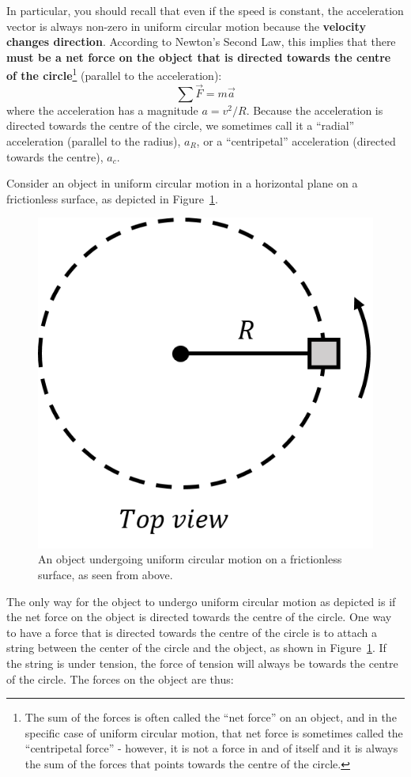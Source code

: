 In particular, you should recall that even if the speed is constant, the acceleration vector is always non-zero in uniform circular motion because the \textbf{velocity changes direction}. According to Newton's Second Law, this implies that there \textbf{must be a net force on the object that is directed towards the centre of the circle}\footnote{The sum of the forces is often called the ``net force'' on an object, and in the specific case of uniform circular motion, that net force is sometimes called the ``centripetal force'' - however, it is not a force in and of itself and it is always the sum of the forces that points towards the centre of the circle.} (parallel to the acceleration):
\begin{equation}
\sum \vec F = m\vec a
\end{equation}
where the acceleration has a magnitude $a=v^2/R$. Because the acceleration is directed towards the centre of the circle, we sometimes call it a ``radial'' acceleration (parallel to the radius), $a_R$, or a ``centripetal'' acceleration (directed towards the centre), $a_c$.

Consider an object in uniform circular motion in a horizontal plane on a frictionless surface, as depicted in Figure~\ref{fig:applyingnewtonslaws:circleH}.

\begin{figure}[!htbp]
\centering
\includegraphics[width=0.3\linewidth]{files/circleH-14562d22cc39e77912bf057585173f4f.png}
\caption[]{An object undergoing uniform circular motion on a frictionless surface, as seen from above.}
\label{fig:applyingnewtonslaws:circleH}
\end{figure}

The only way for the object to undergo uniform circular motion as depicted is if the net force on the object is directed towards the centre of the circle. One way to have a force that is directed towards the centre of the circle is to attach a string between the center of the circle and the object, as shown in Figure~\ref{fig:applyingnewtonslaws:circleH}. If the string is under tension, the force of tension will always be towards the centre of the circle. The forces on the object are thus:

